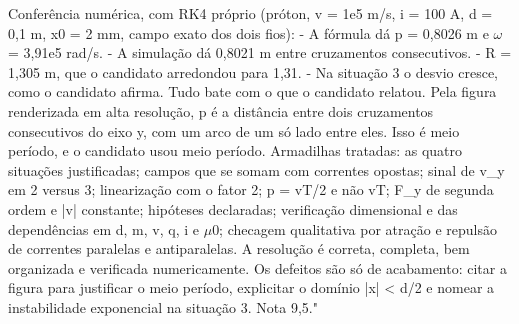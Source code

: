 \documentclass{article}%
\begin{document}
\newline%
Conferência numérica, com RK4 próprio (próton, v = 1e5 m/s, i = 100 A, d = 0,1 m, x0 = 2 mm, campo exato dos dois fios):\newline%
{-} A fórmula dá p = 0,8026 m e $\omega$ = 3,91e5 rad/s.\newline%
{-} A simulação dá 0,8021 m entre cruzamentos consecutivos.\newline%
{-} R = 1,305 m, que o candidato arredondou para 1,31.\newline%
{-} Na situação 3 o desvio cresce, como o candidato afirma.\newline%
Tudo bate com o que o candidato relatou.\newline%
\newline%
Pela figura renderizada em alta resolução, p é a distância entre dois cruzamentos consecutivos do eixo y, com um arco de um só lado entre eles. Isso é meio período, e o candidato usou meio período.\newline%
\newline%
Armadilhas tratadas: as quatro situações justificadas; campos que se somam com correntes opostas; sinal de v\_y em 2 versus 3; linearização com o fator 2; p = vT/2 e não vT; F\_y de segunda ordem e |v| constante; hipóteses declaradas; verificação dimensional e das dependências em d, m, v, q, i e $\mu$0; checagem qualitativa por atração e repulsão de correntes paralelas e antiparalelas.\newline%
\newline%
A resolução é correta, completa, bem organizada e verificada numericamente. Os defeitos são só de acabamento: citar a figura para justificar o meio período, explicitar o domínio |x| < d/2 e nomear a instabilidade exponencial na situação 3. Nota 9,5."%
\end{document}
